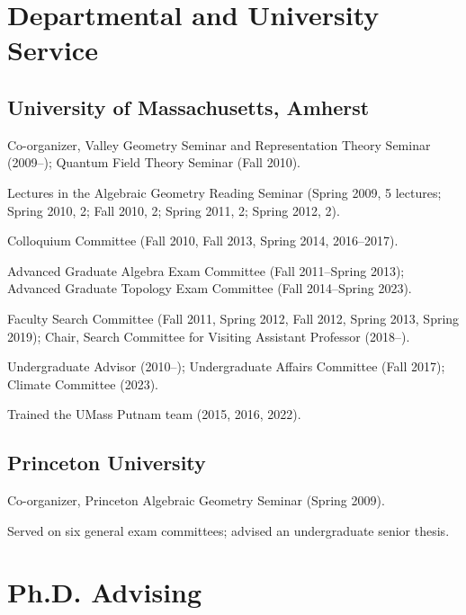 \documentclass[11pt]{article}
\begin{document}
\section{Departmental and University Service}

\subsection*{University of Massachusetts, Amherst}

\begin{cvlist}
  \item Co-organizer, Valley Geometry Seminar and Representation Theory
    Seminar (2009--); Quantum Field Theory Seminar (Fall 2010).
  \item Lectures in the Algebraic Geometry Reading Seminar (Spring 2009,
    5 lectures; Spring 2010, 2; Fall 2010, 2; Spring 2011, 2; Spring 2012, 2).
  \item Colloquium Committee (Fall 2010, Fall 2013, Spring 2014, 2016--2017).
  \item Advanced Graduate Algebra Exam Committee (Fall 2011--Spring 2013);
    Advanced Graduate Topology Exam Committee (Fall 2014--Spring 2023).
  \item Faculty Search Committee (Fall 2011, Spring 2012, Fall 2012,
    Spring 2013, Spring 2019); Chair, Search Committee for Visiting Assistant
    Professor (2018--).
  \item Undergraduate Advisor (2010--); Undergraduate Affairs Committee
    (Fall 2017); Climate Committee (2023).
  \item Trained the UMass Putnam team (2015, 2016, 2022).
\end{cvlist}

\subsection*{Princeton University}

\begin{cvlist}
  \item Co-organizer, Princeton Algebraic Geometry Seminar (Spring 2009).
  \item Served on six general exam committees; advised an undergraduate
    senior thesis.
\end{cvlist}

\section{Ph.D. Advising}
\end{document}
